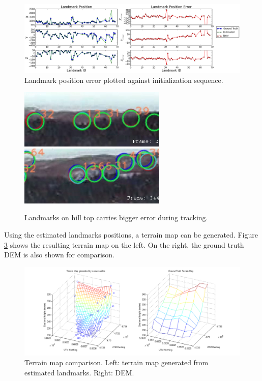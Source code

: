 \begin{figure}[h]
\centering
\includegraphics[width=16cm, keepaspectratio=true]
{./Figures/fltfig/cut1/Figure60.png}
\caption{Landmark position error plotted against initialization sequence. }
\label{fltfig:9}
\end{figure}

\begin{figure}[h]
\centering
\includegraphics[width=7cm, keepaspectratio=true]
{./Figures/fltfig/landmark_13_31_32.jpg}
\includegraphics[width=7cm, keepaspectratio=true]
{./Figures/fltfig/landmark_13_65_32.jpg}
\caption{Landmarks on hill top carries bigger error during tracking.}
\label{fltfig:line_features}
\end{figure}

Using the estimated landmarks positions, a terrain map can be
generated. Figure \ref{fltfig:10} shows the resulting terrain map on
the left. On the right, the ground truth DEM is also shown for
comparison.

\begin{figure}[h]
\centering
\includegraphics[width=14cm, keepaspectratio=true]
{./Figures/fltfig/cut1/terrain/terrain_map_cmp.png}
\caption{Terrain map comparison. Left: terrain map generated from
  estimated landmarks. Right: DEM. }
\label{fltfig:10}
\end{figure}
\FloatBarrier

